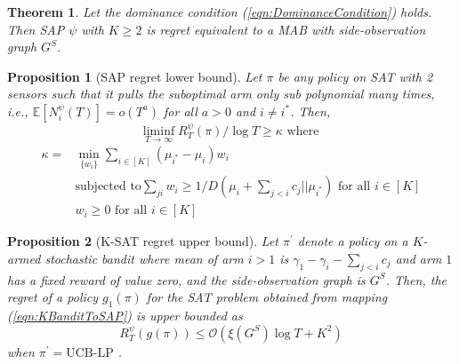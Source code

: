 \documentclass{article}
\newtheorem{thm}{Theorem}
\newtheorem{proposition}{Proposition}
\newtheorem{remark}{Remark}
\begin{document}
\begin{thm}
	\label{thm:K-SAPRegret}
Let the dominance condition (\ref{eqn:DominanceCondition}) holds. Then SAP $\psi$ with $K\geq 2$ is regret equivalent to a MAB with side-observation graph $G^S$. 
\end{thm}




\begin{proposition}[SAP regret lower bound]
	Let $\pi$ be any policy on SAT with 2 sensors such that it pulls the suboptimal arm only sub polynomial many times, i.e., $\mathbb{E}[N^\psi_i(T)]=o(T^a)$ for all $a>0$ and $i\neq i^*$. Then,
	\begin{equation}
	\liminf_{T \rightarrow \infty} R^\psi_T(\pi)/\log T \geq \kappa \mbox{	where  }
	\end{equation}
		\begin{align}
	\kappa=&\displaystyle\min_{\{w_i\}}\sum_{i \in [K]}(\mu_{i^*}- \mu_i) w_i \nonumber\\
	& \mbox{subjected to} \sum_{j i}w_i\geq 1/D(\mu_i + \sum_{j<i} c_j || \mu_{i^*}) \mbox{  for all } i\in [K]\\
	& w_i \geq 0 \mbox{ for all } i \in [K] \nonumber
	\end{align}
\end{proposition}

\begin{proposition}[K-SAT regret upper bound]
	Let $\pi^\prime$ denote a policy on a $K$-armed stochastic bandit where mean of arm $i>1$ is $\gamma_1-\gamma_i-\sum_{j<i}c_j$ and arm $1$ has a fixed reward of value zero, and the side-observation graph is $G^S$.  Then, the regret of a policy $g_1(\pi)$ for the SAT problem obtained from mapping (\ref{eqn:KBanditToSAP}) is upper bounded as
	\begin{equation}
	R^\psi_T(g(\pi))\leq \mathcal{O}(\xi(G^S)\log T + K^2)
	\end{equation}
	when $\pi^\prime=\mbox{UCB-LP}$ \cite{Sigmetrics15_StochasticBanditsWithSideObservations_BuccapatnamEriyilmazShroff}.
\end{proposition}
\end{document}
